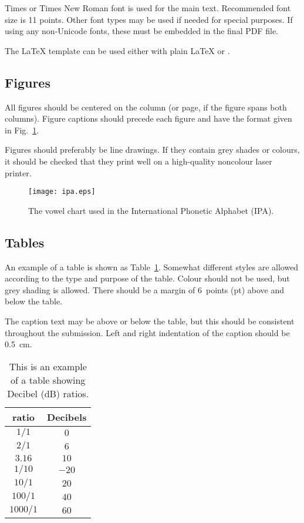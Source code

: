 \documentclass[a4paper,11pt,twocolumn]{article}
\begin{document}
Times or Times New Roman font is used for the main text. Recommended font size is 11 points. Other font types may be used if needed for special purposes. If using any non-Unicode fonts, these must be embedded in the final PDF file.

The \LaTeX{} template can be used either with plain \LaTeX{} or \XeLaTeX.

\subsection{Figures}

All figures should be centered on the column (or page, if the figure
spans both columns). Figure captions should precede each figure and
have the format given in Fig.~\ref{fig:vowels}.

Figures should preferably be line drawings. If they contain grey
shades or colours, it should be checked that they print well on a
high-quality noncolour laser printer.

\begin{figure}[!ht]
\caption{The vowel chart used in the International Phonetic
Alphabet (IPA).}\label{fig:vowels}
\begin{center}
\texttt{[image: ipa.eps]}
\end{center}
\end{figure}

\subsection{Tables}

An example of a table is shown as Table~\ref{tab:decibel}.  Somewhat
different styles are allowed according to the type and purpose of the
table. Colour should not be used, but grey shading is allowed. There
should be a margin of 6~points (pt) above and below the table.

The caption text may be above or below the table, but this should be
consistent throughout the submission. Left and right indentation of
the caption should be 0.5~cm.

\begin{table}[!ht]
\caption{This is an example of a table showing Decibel (dB)
ratios.}\label{tab:decibel}
\begin{center}
\begin{tabular}{|c|c|}
\hline
\rowcolor[gray]{.75}
ratio    & Decibels\\
\hline
$1/1$    & $0$\\
$2/1$    & $6$\\
$3.16$   & $10$\\
$1/10$   & $-20$\\
$10/1$   & $20$\\
$100/1$  & $40$\\
$1000/1$ & $60$\\
\hline
\end{tabular}
\end{center}
\end{table}
\end{document}
